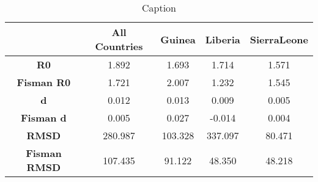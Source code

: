 \begin{table}[hbt]
\caption{Caption}
\centering
\begin{tabular}{c c c c c}
\toprule 
     \ & All Countries & Guinea & Liberia & SierraLeone\\ 
\midrule 
    \textbf{R0} & 1.892 & 1.693 & 1.714 & 1.571 \\ 
    \textbf{Fisman R0} & 1.721 & 2.007 & 1.232 & 1.545 \\ 
    \textbf{d} & 0.012 & 0.013 & 0.009 & 0.005 \\ 
    \textbf{Fisman d} & 0.005 & 0.027 & -0.014 & 0.004 \\ 
    \textbf{RMSD} & 280.987 & 103.328 & 337.097 & 80.471 \\ 
    \textbf{Fisman RMSD} & 107.435 & 91.122 & 48.350 & 48.218 \\ 
\bottomrule 
\end{tabular}
\end{table}
